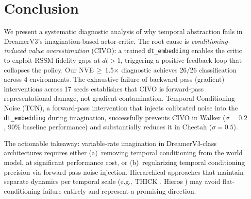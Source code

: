 \documentclass[10pt,letterpaper]{article}
\begin{document}
\section{Conclusion}

We present a systematic diagnostic analysis of why temporal abstraction fails in DreamerV3's imagination-based actor-critic.
The root cause is \emph{conditioning-induced value overestimation} (CIVO): a trained \texttt{dt\_embedding} enables the critic to exploit RSSM fidelity gaps at $dt>1$, triggering a positive feedback loop that collapses the policy.
Our NVE\,$\geq$\,1.5$\times$ diagnostic achieves 26/26 classification across 4 environments.
The exhaustive failure of backward-pass (gradient) interventions across 17 seeds establishes that CIVO is forward-pass representational damage, not gradient contamination.
Temporal Conditioning Noise (TCN), a forward-pass intervention that injects calibrated noise into the \texttt{dt\_embedding} during imagination, successfully prevents CIVO in Walker ($\sigma=0.2$, 90\% baseline performance) and substantially reduces it in Cheetah ($\sigma=0.5$).

The actionable takeaway: variable-rate imagination in DreamerV3-class architectures requires either (a)~removing temporal conditioning from the world model, at significant performance cost, or (b)~regularizing temporal conditioning precision via forward-pass noise injection.
Hierarchical approaches that maintain separate dynamics per temporal scale (e.g., THICK \cite{kim2024thick}, Hieros \cite{robine2024hieros}) may avoid flat-conditioning failure entirely and represent a promising direction.


\end{document}

